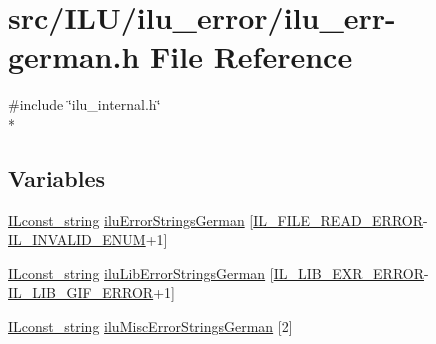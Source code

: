 \hypertarget{ilu__err-german_8h}{\section{src/\-I\-L\-U/ilu\-\_\-error/ilu\-\_\-err-\/german.h File Reference}
\label{ilu__err-german_8h}
}
{\ttfamily \#include \char`\"{}ilu\-\_\-internal.\-h\char`\"{}}\\*
\subsection*{Variables}
\begin{DoxyCompactItemize}
\item 
\hyperlink{il_8h_a103ef32cc870d648d471aff6c7076747}{I\-Lconst\-\_\-string} \hyperlink{ilu__err-german_8h_a77afb56308846d8589585c2cf89c908a}{ilu\-Error\-Strings\-German} \mbox{[}\hyperlink{il_8h_ae70fdd3b6e8434371177ed2547b75841}{I\-L\-\_\-\-F\-I\-L\-E\-\_\-\-R\-E\-A\-D\-\_\-\-E\-R\-R\-O\-R}-\/\hyperlink{il_8h_adf311fb99b5d12d7ef3795b0ab3dd918}{I\-L\-\_\-\-I\-N\-V\-A\-L\-I\-D\-\_\-\-E\-N\-U\-M}+1\mbox{]}
\item 
\hyperlink{il_8h_a103ef32cc870d648d471aff6c7076747}{I\-Lconst\-\_\-string} \hyperlink{ilu__err-german_8h_a05e5776f0083644b5f62a53e3d1d728f}{ilu\-Lib\-Error\-Strings\-German} \mbox{[}\hyperlink{il_8h_a4792903188701caaeaa625e49af84a66}{I\-L\-\_\-\-L\-I\-B\-\_\-\-E\-X\-R\-\_\-\-E\-R\-R\-O\-R}-\/\hyperlink{il_8h_ab2d4eb290bfe9e2e5c8d590213034e50}{I\-L\-\_\-\-L\-I\-B\-\_\-\-G\-I\-F\-\_\-\-E\-R\-R\-O\-R}+1\mbox{]}
\item 
\hyperlink{il_8h_a103ef32cc870d648d471aff6c7076747}{I\-Lconst\-\_\-string} \hyperlink{ilu__err-german_8h_a1e3d20fd3db63366ca2994b892f46134}{ilu\-Misc\-Error\-Strings\-German} \mbox{[}2\mbox{]}
\end{DoxyCompactItemize}


